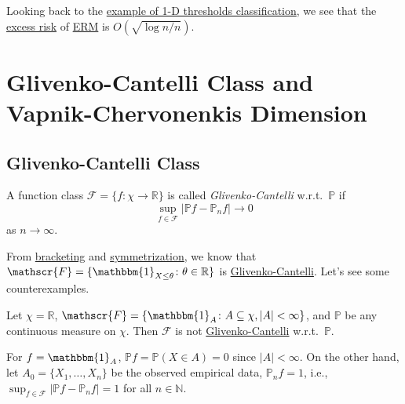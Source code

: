 \begin{remark}
	Looking back to the \hyperref[eg:1D-classification-thresholds]{example of 1-D thresholds classification}, we see that the \hyperref[not:excess-risk]{excess risk} of \hyperref[prb:ERM]{ERM} is \(O(\sqrt{\log n / n} )\).
\end{remark}

\section{Glivenko-Cantelli Class and Vapnik-Chervonenkis Dimension}
\subsection{Glivenko-Cantelli Class}
\begin{definition}\label{def:Glivenko-Cantelli}
	A function class \(\mathscr{F} = \{ f\colon \chi \to \mathbb{R} \} \) is called \emph{Glivenko-Cantelli} w.r.t.\ \(\mathbb{P} \) if
	\[
		\sup _{f\in \mathscr{F} } \left\vert \mathbb{P} f - \mathbb{P} _n f \right\vert \to 0
	\]
	as \(n \to \infty \).
\end{definition}

From \hyperref[prop:bracketing]{bracketing} and \hyperref[prop:symmetrization]{symmetrization}, we know that \(\mathscr{F} = \{ \mathbbm{1}_{X \leq \theta } \colon \theta \in \mathbb{R} \} \) is \hyperref[def:Glivenko-Cantelli]{Glivenko-Cantelli}. Let's see some counterexamples.

\begin{eg}
	Let \(\chi = \mathbb{R} \), \(\mathscr{F} = \{ \mathbbm{1}_{A} \colon A \subseteq \chi, \vert A \vert < \infty \} \), and \(\mathbb{P} \) be any continuous measure on \(\chi \). Then \(\mathscr{F} \) is not \hyperref[def:Glivenko-Cantelli]{Glivenko-Cantelli} w.r.t.\ \(\mathbb{P} \).
\end{eg}
\begin{explanation}
	For \(f = \mathbbm{1}_{A} \), \(\mathbb{P} f = \mathbb{P} (X\in A) = 0\) since \(\vert A \vert < \infty \). On the other hand, let \(A_0 = \{ X_1, \dots , X_n \} \) be the observed empirical data, \(\mathbb{P} _n f = 1\), i.e., \(\sup _{f\in \mathscr{F} } \vert \mathbb{P} f - \mathbb{P} _n f \vert = 1\) for all \(n\in \mathbb{N} \).
\end{explanation}

